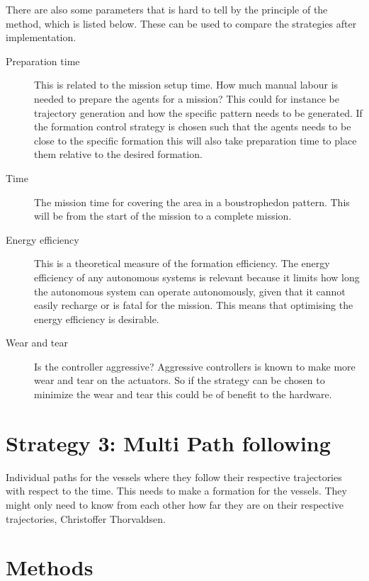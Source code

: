 There are also some parameters that is hard to tell by the principle
of the method, which is listed below. These can be used to compare the
strategies after implementation.
\begin{description}
\item[Preparation time] This is related to the mission setup time. How
	much manual labour is needed to prepare the agents for a mission?
	This could for instance be trajectory generation and how the
	specific pattern needs to be generated. If the formation control strategy is chosen such that the agents needs to be close to the specific formation this will also take preparation time to place them relative to the desired formation.
\item[Time] The mission time for covering the area in a boustrophedon
	pattern. This will be from the start of the mission to a complete mission.
\item[Energy efficiency] This is a theoretical measure of the
	formation efficiency. The energy efficiency of any autonomous systems is relevant because it limits how long the autonomous system can operate autonomously, given that it cannot easily recharge or is fatal for the mission. This means that optimising the energy efficiency is desirable.
\item[Wear and tear] Is the controller aggressive? Aggressive
	controllers is known to make more wear and tear on the actuators. So
	if the strategy can be chosen to minimize the wear and tear this
	could be of benefit to the hardware.
\end{description}






\section{Strategy 3: Multi Path following}
Individual paths for the vessels where they follow their respective trajectories with respect to the time. This needs to make a formation for the vessels. They might only need to know from each other how far they are on their respective trajectories, Christoffer Thorvaldsen.





\section{Methods}

